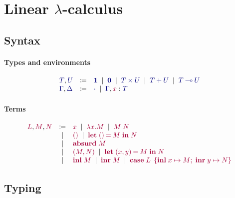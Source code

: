 \documentclass[main.tex]{subfiles}
\begin{document}
\section{Linear $\lambda$-calculus}

\subsection{Syntax}
\label{sec:llam-syntax}

\paragraph{Types and environments}
\[
\begin{array}{lcl}
  \ty{T}, \ty{U}
  & \coloneqq & \ty{\tyunit}
    \sep        \ty{\tyvoid}
    \sep        \ty{\typrod{T}{U}}
    \sep        \ty{\tysum{T}{U}}
    \sep        \ty{\tylolli{T}{U}}
  \\
  \ty{\Gamma}, \ty{\Delta}
  & \coloneqq & \ty{\emptyenv}
    \sep        \ty{\Gamma}, \tmty{x}{T}
\end{array}
\]

\paragraph{Terms}
\[
\begin{array}{lcl}
  \tm{L}, \tm{M}, \tm{N}
  & \coloneqq & \tm{x}
    \sep        \tm{\lambda x.M}
    \sep        \tm{M\;N} \\
  & \sep      & \tm{\unit}
    \sep        \tm{\letunit{M}{N}} \\
  & \sep      & \tm{\absurd{M}} \\
  & \sep      & \tm{\pair{M}{N}}
    \sep        \tm{\letpair{x}{y}{M}{N}} \\
  & \sep      & \tm{\inl{M}}
    \sep        \tm{\inr{M}}
    \sep        \tm{\casesum{L}{x}{M}{y}{N}} \\
\end{array}
\]

\subsection{Typing}%
\label{sec:llam-typing}
\end{document}
